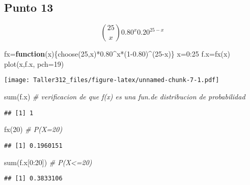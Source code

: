 \documentclass[
]{article}
\newenvironment{Shaded}{\begin{snugshade}}{\end{snugshade}}
\newcommand{\AttributeTok}[1]{\textcolor[rgb]{0.77,0.63,0.00}{#1}}
\newcommand{\CommentTok}[1]{\textcolor[rgb]{0.56,0.35,0.01}{\textit{#1}}}
\newcommand{\ControlFlowTok}[1]{\textcolor[rgb]{0.13,0.29,0.53}{\textbf{#1}}}
\newcommand{\DecValTok}[1]{\textcolor[rgb]{0.00,0.00,0.81}{#1}}
\newcommand{\FloatTok}[1]{\textcolor[rgb]{0.00,0.00,0.81}{#1}}
\newcommand{\FunctionTok}[1]{\textcolor[rgb]{0.00,0.00,0.00}{#1}}
\newcommand{\NormalTok}[1]{#1}
\newcommand{\OtherTok}[1]{\textcolor[rgb]{0.56,0.35,0.01}{#1}}
\newcommand{\SpecialCharTok}[1]{\textcolor[rgb]{0.00,0.00,0.00}{#1}}
\begin{document}
\hypertarget{punto-13}{%
\subsection{Punto 13}\label{punto-13}}

\[\binom{25}{x}0.80^x 0.20^{25-x}\]

\begin{Shaded}
\begin{Highlighting}[]
\NormalTok{fx}\OtherTok{=}\ControlFlowTok{function}\NormalTok{(x)\{}\FunctionTok{choose}\NormalTok{(}\DecValTok{25}\NormalTok{,x)}\SpecialCharTok{*}\FloatTok{0.80}\SpecialCharTok{\^{}}\NormalTok{x}\SpecialCharTok{*}\NormalTok{(}\DecValTok{1}\FloatTok{{-}0.80}\NormalTok{)}\SpecialCharTok{\^{}}\NormalTok{(}\DecValTok{25}\SpecialCharTok{{-}}\NormalTok{x)\}}
\NormalTok{x}\OtherTok{=}\DecValTok{0}\SpecialCharTok{:}\DecValTok{25}
\NormalTok{f.x}\OtherTok{=}\FunctionTok{fx}\NormalTok{(x)}
\FunctionTok{plot}\NormalTok{(x,f.x, }\AttributeTok{pch=}\DecValTok{19}\NormalTok{)}
\end{Highlighting}
\end{Shaded}

\texttt{[image: Taller312\_files/figure-latex/unnamed-chunk-7-1.pdf]}

\begin{Shaded}
\begin{Highlighting}[]
\FunctionTok{sum}\NormalTok{(f.x) }\CommentTok{\# verificacion de que f(x) es una fun.de distribucion de probabilidad}
\end{Highlighting}
\end{Shaded}

\begin{verbatim}
## [1] 1
\end{verbatim}

\begin{Shaded}
\begin{Highlighting}[]
\FunctionTok{fx}\NormalTok{(}\DecValTok{20}\NormalTok{) }\CommentTok{\# P(X=20)}
\end{Highlighting}
\end{Shaded}

\begin{verbatim}
## [1] 0.1960151
\end{verbatim}

\begin{Shaded}
\begin{Highlighting}[]
\FunctionTok{sum}\NormalTok{(f.x[}\DecValTok{0}\SpecialCharTok{:}\DecValTok{20}\NormalTok{]) }\CommentTok{\# P(X\textless{}=20)}
\end{Highlighting}
\end{Shaded}

\begin{verbatim}
## [1] 0.3833106
\end{verbatim}
\end{document}
